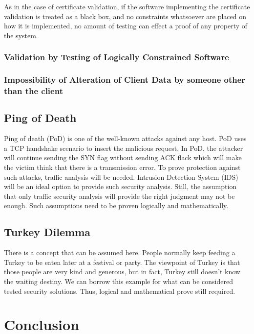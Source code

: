 \documentclass[journal]{IEEEtran}
\begin{document}
As in the case of certificate validation,
if the software implementing the certificate validation is treated
as a black box, and no constraints whatsoever are placed on how it is
implemented, no amount of testing can effect a proof of any
property of the system.

\subsubsection{Validation by Testing of Logically Constrained Software}

\subsubsection{Impossibility of Alteration of Client Data by someone other than the client}

\subsection{Ping of Death}
Ping of death (PoD) is one of the well-known attacks against any host. PoD uses a TCP handshake
scenario to insert the malicious request. In PoD, the attacker will continue sending the SYN flag
without sending ACK flack which will make the victim think that there is a transmission error. To
prove protection against such attacks, traffic analysis will be needed. Intrusion Detection System
(IDS) will be an ideal option to provide such security analysis. Still, the assumption that only
traffic security analysis will provide the right judgment may not be enough. Such assumptions need
to be proven logically and mathematically.


\subsection{Turkey Dilemma}
There is a concept that can be assumed here. People normally keep feeding a Turkey to be eaten later at
a festival or party. The viewpoint of Turkey is that those people are very kind and generous, but in fact,
Turkey still doesn't know the waiting destiny. We can borrow this example for what can be considered tested
security solutions. Thus, logical and mathematical prove still required.
\section{Conclusion}





\end{document}
